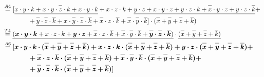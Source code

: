 \documentclass{article}
\newcommand*{\oline}[1]{\overline{#1\mathstrut}}
\newcommand{\bigspace}{\quad\quad\quad\quad}
\begin{document}
\begin{align*}
  &\overset{A4}{=} [\underline{x \cdot y \cdot k + x \cdot y \cdot \oline{z} \cdot k + x \cdot y \cdot k} + x \cdot z \cdot k + \underline{y \cdot z + x \cdot y \cdot z + y \cdot z \cdot k + \oline{x} \cdot y \cdot z + y \cdot z \cdot \oline{k}} +\\
  &\bigspace + \underline{\oline{y} \cdot \oline{z} \cdot \oline{k} + x \cdot \oline{y} \cdot \oline{z} \cdot \oline{k}} + \oline{x} \cdot z \cdot \oline{k} + \oline{x} \cdot \oline{y} \cdot \oline{k}] \cdot (\oline{x}+\oline{y}+\oline{z}+\oline{k})\\
  &\overset{T4}{=} \underline{(\bm{x \cdot y \cdot k} + x \cdot z \cdot k + \bm{y \cdot z} + \oline{x} \cdot z \cdot \oline{k} + \oline{x} \cdot \oline{y} \cdot \oline{k} + \bm{\oline{y} \cdot \oline{z} \cdot \oline{k}})} \cdot \underline{(\oline{x}+\oline{y}+\oline{z}+\oline{k})}\\
  &\overset{A6}{=} [\bm{x \cdot y \cdot k \cdot (\oline{x}+\oline{y}+\oline{z}+\oline{k}) + x \cdot z \cdot k \cdot (\oline{x}+\oline{y}+\oline{z}+\oline{k}) + y \cdot z \cdot (\oline{x}+\oline{y}+\oline{z}+\oline{k}) +}\\
  &\bigspace \bm{+ \oline{x} \cdot z \cdot \oline{k} \cdot (\oline{x}+\oline{y}+\oline{z}+\oline{k}) + \oline{x} \cdot \oline{y} \cdot \oline{k} \cdot (\oline{x}+\oline{y}+\oline{z}+\oline{k}) +}\\
  &\bigspace \bm{+ \oline{y} \cdot \oline{z} \cdot \oline{k} \cdot (\oline{x}+\oline{y}+\oline{z}+\oline{k})}]
\end{align*}

\newpage
\end{document}
